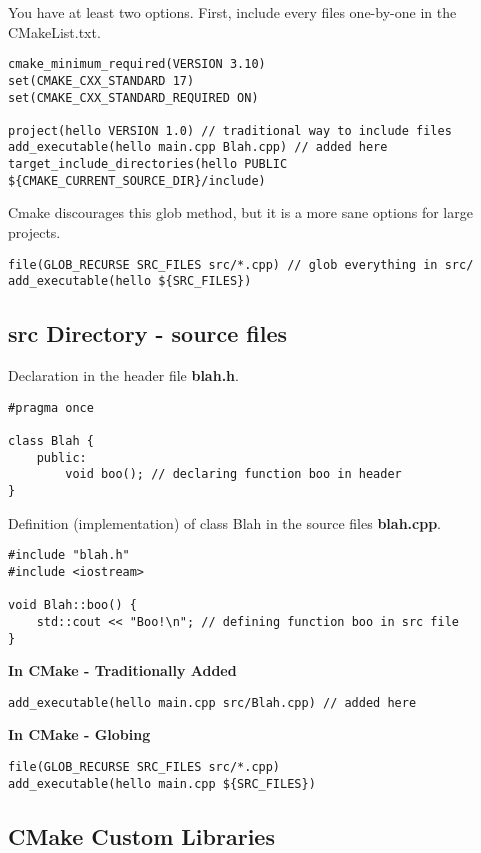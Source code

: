 You have at least two options. First, include every files one-by-one in the CMakeList.txt.
\begin{verbatim}
cmake_minimum_required(VERSION 3.10)
set(CMAKE_CXX_STANDARD 17)
set(CMAKE_CXX_STANDARD_REQUIRED ON)

project(hello VERSION 1.0) // traditional way to include files
add_executable(hello main.cpp Blah.cpp) // added here
target_include_directories(hello PUBLIC ${CMAKE_CURRENT_SOURCE_DIR}/include)
\end{verbatim}

Cmake discourages this glob method, but it is a more sane options for large projects.

\begin{verbatim}
file(GLOB_RECURSE SRC_FILES src/*.cpp) // glob everything in src/
add_executable(hello ${SRC_FILES})
\end{verbatim}

\subsection{src Directory - source files}

Declaration in the header file \textbf{blah.h}.
\begin{verbatim}
#pragma once

class Blah {
    public:
        void boo(); // declaring function boo in header
}
\end{verbatim}

Definition (implementation) of class Blah in the source files \textbf{blah.cpp}.
\begin{verbatim}
#include "blah.h"
#include <iostream>

void Blah::boo() {
    std::cout << "Boo!\n"; // defining function boo in src file
}
\end{verbatim}

\textbf{In CMake - Traditionally Added}
\begin{verbatim}
add_executable(hello main.cpp src/Blah.cpp) // added here
\end{verbatim}

\textbf{In CMake - Globing}
\begin{verbatim}
file(GLOB_RECURSE SRC_FILES src/*.cpp)
add_executable(hello main.cpp ${SRC_FILES})
\end{verbatim}

\subsection{CMake Custom Libraries}

